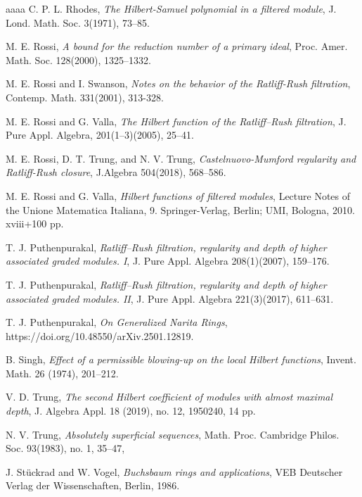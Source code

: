 \documentclass[reqno,a4paper,dvipsnames]{amsart}
\theoremstyle{definition}
\begin{document}
\begin{thebibliography}{aaaa}
 C. P. L. Rhodes, \textit{The Hilbert-Samuel polynomial in a filtered module}, J. Lond. Math. Soc. 3(1971), 73–85.

 M. E. Rossi, \textit{A bound for the reduction number of a primary ideal}, Proc. Amer. Math. Soc. 128(2000),
1325–1332.

 M. E. Rossi and I. Swanson, \textit{Notes on the behavior of the Ratliff-Rush filtration}, Contemp. Math. 331(2001), 313-328.


  M. E. Rossi and G. Valla, \textit{The Hilbert function of the Ratliff–Rush filtration}, J. Pure Appl. Algebra, 201(1–3)(2005), 25–41.

 M. E.  Rossi, D. T. Trung, and N. V. Trung,  \textit{Castelnuovo-Mumford regularity and Ratliff-Rush closure}, J.Algebra
504(2018), 568–586. 

 M. E. Rossi and G. Valla, \textit{Hilbert functions of filtered modules}, Lecture Notes of the Unione Matematica Italiana, 9. Springer-Verlag, Berlin; UMI, Bologna, 2010. xviii+100 pp.

 T. J. Puthenpurakal, \textit{Ratliff–Rush filtration, regularity and depth of higher associated graded modules. I}, J. Pure Appl. Algebra 208(1)(2007), 159–176.

 T. J. Puthenpurakal, \textit{Ratliff–Rush filtration, regularity and depth of higher associated graded modules. II}, J. Pure Appl. Algebra  221(3)(2017), 611–631.

 T. J. Puthenpurakal, \textit{On Generalized Narita Rings}, 
https://doi.org/10.48550/arXiv.2501.12819.

 B. Singh,
\textit{Effect of a permissible blowing-up on the local Hilbert functions}, Invent. Math. 26 (1974), 201–212.

 V. D. Trung, \textit{The second Hilbert coefficient of modules with almost maximal depth}, 
J. Algebra Appl. 18 (2019), no. 12, 1950240, 14 pp.

  N. V. Trung, \textit{Absolutely superficial sequences}, Math. Proc. Cambridge Philos. Soc. 93(1983), no. 1, 35–47,


  J. St\"{u}ckrad and W. Vogel, \textit{Buchsbaum rings and applications}, VEB Deutscher Verlag der Wissenschaften, Berlin, 1986.



\end{thebibliography}
\end{document}
